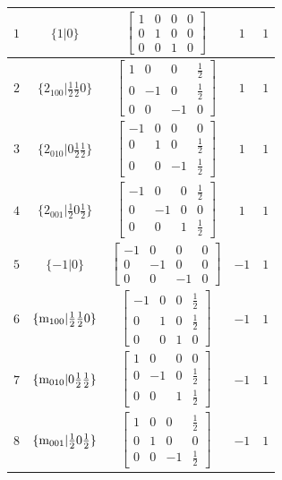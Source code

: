 \documentclass[fleqn,8pt]{jsarticle}
\begin{document}
\begin{longtable}{ccccc}
$ 1 $ & $ \{1|0\} $ & $ \begin{bmatrix} 1 & 0 & 0 & 0 \\ 0 & 1 & 0 & 0 \\ 0 & 0 & 1 & 0 \end{bmatrix} $ & $ 1 $ & $ 1 $ \\ \hline
$ 2 $ & $ \{2{}_{100}|\frac{1}{2} \frac{1}{2} 0\} $ & $ \begin{bmatrix} 1 & 0 & 0 & \frac{1}{2} \\ 0 & -1 & 0 & \frac{1}{2} \\ 0 & 0 & -1 & 0 \end{bmatrix} $ & $ 1 $ & $ 1 $ \\ \hline
$ 3 $ & $ \{2{}_{010}|0 \frac{1}{2} \frac{1}{2}\} $ & $ \begin{bmatrix} -1 & 0 & 0 & 0 \\ 0 & 1 & 0 & \frac{1}{2} \\ 0 & 0 & -1 & \frac{1}{2} \end{bmatrix} $ & $ 1 $ & $ 1 $ \\ \hline
$ 4 $ & $ \{2{}_{001}|\frac{1}{2} 0 \frac{1}{2}\} $ & $ \begin{bmatrix} -1 & 0 & 0 & \frac{1}{2} \\ 0 & -1 & 0 & 0 \\ 0 & 0 & 1 & \frac{1}{2} \end{bmatrix} $ & $ 1 $ & $ 1 $ \\ \hline
$ 5 $ & $ \{-1|0\} $ & $ \begin{bmatrix} -1 & 0 & 0 & 0 \\ 0 & -1 & 0 & 0 \\ 0 & 0 & -1 & 0 \end{bmatrix} $ & $ -1 $ & $ 1 $ \\ \hline
$ 6 $ & $ \{{\rm m}_{100}|\frac{1}{2} \frac{1}{2} 0\} $ & $ \begin{bmatrix} -1 & 0 & 0 & \frac{1}{2} \\ 0 & 1 & 0 & \frac{1}{2} \\ 0 & 0 & 1 & 0 \end{bmatrix} $ & $ -1 $ & $ 1 $ \\ \hline
$ 7 $ & $ \{{\rm m}_{010}|0 \frac{1}{2} \frac{1}{2}\} $ & $ \begin{bmatrix} 1 & 0 & 0 & 0 \\ 0 & -1 & 0 & \frac{1}{2} \\ 0 & 0 & 1 & \frac{1}{2} \end{bmatrix} $ & $ -1 $ & $ 1 $ \\ \hline
$ 8 $ & $ \{{\rm m}_{001}|\frac{1}{2} 0 \frac{1}{2}\} $ & $ \begin{bmatrix} 1 & 0 & 0 & \frac{1}{2} \\ 0 & 1 & 0 & 0 \\ 0 & 0 & -1 & \frac{1}{2} \end{bmatrix} $ & $ -1 $ & $ 1 $ \\ \hline

\end{longtable}
\end{document}
